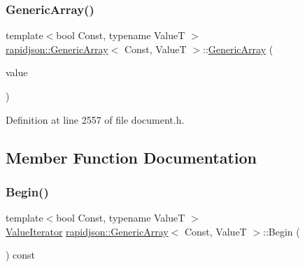 \subsubsection{\texorpdfstring{GenericArray()}{GenericArray()}\hspace{0.1cm}{\footnotesize\ttfamily [3/3]}}
{\footnotesize\ttfamily template$<$bool Const, typename ValueT $>$ \\
\mbox{\hyperlink{classrapidjson_1_1_generic_array}{rapidjson\+::\+Generic\+Array}}$<$ Const, ValueT $>$\+::\mbox{\hyperlink{classrapidjson_1_1_generic_array}{Generic\+Array}} (\begin{DoxyParamCaption}\item[{\mbox{\hyperlink{classrapidjson_1_1_generic_array_aebd828a2f020262b41af908fbb28a571}{Value\+Type}} \&}]{value }\end{DoxyParamCaption})\hspace{0.3cm}{\ttfamily [private]}}



Definition at line 2557 of file document.\+h.


\begin{DoxyCode}{0}

\end{DoxyCode}


\subsection{Member Function Documentation}
\mbox{\label{classrapidjson_1_1_generic_array_a32299e51f24648e04757de26d952ffe7}} 
\subsubsection{\texorpdfstring{Begin()}{Begin()}}
{\footnotesize\ttfamily template$<$bool Const, typename ValueT $>$ \\
\mbox{\hyperlink{classrapidjson_1_1_generic_array_ae94140e6dbab05cd3918d3e75819dc0a}{Value\+Iterator}} \mbox{\hyperlink{classrapidjson_1_1_generic_array}{rapidjson\+::\+Generic\+Array}}$<$ Const, ValueT $>$\+::Begin (\begin{DoxyParamCaption}{ }\end{DoxyParamCaption}) const}



